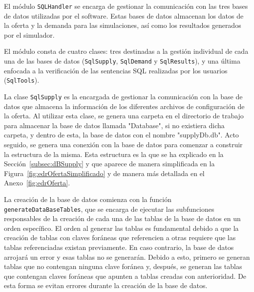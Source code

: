 El módulo \texttt{SQLHandler} se encarga de gestionar la comunicación con las tres bases de datos utilizadas por el software. Estas bases de datos almacenan los datos de la oferta y la demanda para las simulaciones, así como los resultados generados por el simulador.

El módulo consta de cuatro clases: tres destinadas a la gestión individual de cada una de las bases de datos (\texttt{SqlSupply}, \texttt{SqlDemand} y \texttt{SqlResults}), y una última enfocada a la verificación de las sentencias \acrshort{SQL} realizadas por los usuarios (\texttt{SqlTools}).

La clase \texttt{SqlSupply} es la encargada de gestionar la comunicación con la base de datos que almacena la información de los diferentes archivos de configuración de la oferta. Al utilizar esta clase, se genera una carpeta en el directorio de trabajo para almacenar la base de datos llamada "Database", si no existiera dicha carpeta, y dentro de esta, la base de datos con el nombre "supplyDb.db". Acto seguido, se genera una conexión con la base de datos para comenzar a construir la estructura de la misma. Esta estructura es la que se ha explicado en la Sección~\ref{subsec:dBSupply} y que aparece de manera simplificada en la Figura~\ref{fig:edrOfertaSimplificado} y de manera más detallada en el Anexo~\ref{fig:edrOferta}.

La creación de la base de datos comienza con la función \texttt{generateDataBaseTables}, que se encarga de ejecutar las subfunciones responsables de la creación de cada una de las tablas de la base de datos en un orden específico. El orden al generar las tablas es fundamental debido a que la creación de tablas con claves foráneas que referencien a otras requiere que las tablas referenciadas existan previamente. En caso contrario, la base de datos arrojará un error y esas tablas no se generarán. Debido a esto, primero se generan tablas que no contengan ninguna clave foránea y, después, se generan las tablas que contengan claves foráneas que apunten a tablas creadas con anterioridad. De esta forma se evitan errores durante la creación de la base de datos.

